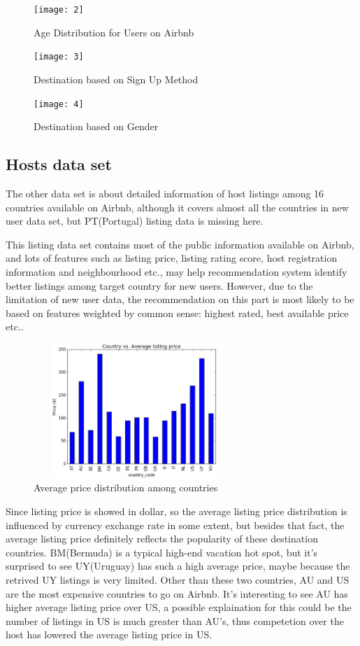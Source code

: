 \documentclass{sig-alternate-05-2015}
\begin{document}
\begin{figure}
\centering
\texttt{[image: 2]}
\caption{Age Distribution for Users on Airbnb}
\end{figure}

\begin{figure}
\centering
\texttt{[image: 3]}
\caption{Destination based on Sign Up Method}

\end{figure}

\begin{figure}
\centering
\texttt{[image: 4]}
\caption{Destination based on Gender}
\end{figure}

\FloatBarrier
\subsection{Hosts data set}
The other data set is about detailed information of host listings among 16 countries available on Airbnb, although it covers almost all the countries in new user data set, but PT(Portugal) listing data is missing here.

This listing data set contains most of the public information available on Airbnb, and lots of features such as listing price, listing rating score, host registration information and neighbourhood etc., may help recommendation system identify better listings among target country for new users. However, due to the limitation of new user data, the recommendation on this part is most likely to be based on features weighted by common sense: highest rated, best available price etc..

\begin{figure}
\centering
\includegraphics[height=2in, width=3in]{country-avgPrice}
\caption{Average price distribution among countries}
\end{figure}

Since listing price is showed in dollar, so the average listing price distribution is influenced by currency exchange rate in some extent, but besides that fact, the average listing price definitely reflects the popularity of these destination countries. BM(Bermuda) is a typical high-end vacation hot spot, but it's surprised to see UY(Uruguay) has such a high average price, maybe because the retrived UY listings is very limited. Other than these two countries, AU and US are the most expensive countries to go on Airbnb. It's interesting to see AU has higher average listing price over US, a possible explaination for this could be the number of listings in US is much greater than AU's, thus competetion over the host has lowered the average listing price in US.
\end{document}
